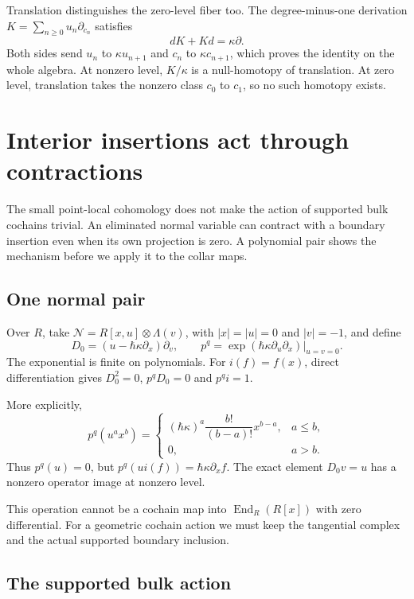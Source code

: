 Translation distinguishes the zero-level fiber too.
The degree-minus-one derivation
\(K=\sum_{n\geq0}u_n\partial_{c_n}\) satisfies
\[
 dK+Kd=\kappa\partial.
\]
Both sides send \(u_n\) to \(\kappa u_{n+1}\) and \(c_n\) to
\(\kappa c_{n+1}\), which proves the identity on the whole algebra.
At nonzero level, \(K/\kappa\) is a null-homotopy of translation.
At zero level, translation takes the nonzero class \(c_0\) to
\(c_1\), so no such homotopy exists.

\section{Interior insertions act through contractions}

The small point-local cohomology does not make the action of supported
bulk cochains trivial.
An eliminated normal variable can contract with a boundary insertion
even when its own projection is zero. A polynomial pair shows the
mechanism before we apply it to the collar maps.

\subsection{One normal pair}

Over\label{pcsm:def:normal-pair} \(R\), take \(\mathcal N=R[x,u]\otimes\Lambda(v)\), with
\(|x|=|u|=0\) and \(|v|=-1\), and define
\[
 D_0=(u-\hbar\kappa\partial_x)\partial_v,
 \qquad
 p^q=\left.\exp(\hbar\kappa\partial_u\partial_x)
                                      \right|_{u=v=0}.
\]
The exponential is finite on polynomials.
For \(i(f)=f(x)\), direct differentiation gives
\(D_0^2=0\), \(p^qD_0=0\) and \(p^qi=1\).

More explicitly,
\[
 p^q(u^ax^b)=
 \begin{cases}
  (\hbar\kappa)^a\dfrac{b!}{(b-a)!}x^{b-a},&a\leq b,\\
  0,&a>b.
 \end{cases}
\]
Thus \(p^q(u)=0\), but \(p^q(ui(f))=\hbar\kappa\partial_xf\).
The exact element \(D_0v=u\) has a nonzero operator image at
nonzero level.

This operation cannot be a cochain map into
\(\operatorname{End}_R(R[x])\) with zero differential.
For a geometric cochain action we must keep the tangential complex
and the actual supported boundary inclusion.

\subsection{The supported bulk action}

